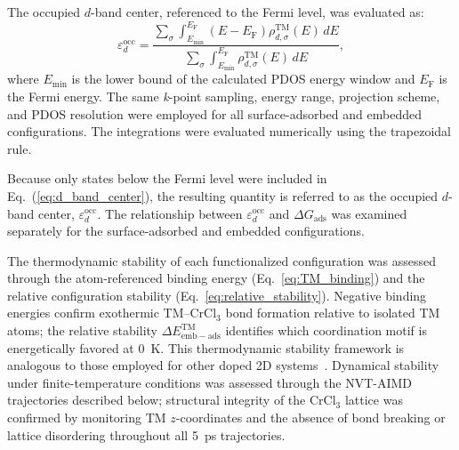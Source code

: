 \documentclass[journal=jacsat,manuscript=article]{achemso}
\begin{document}
The occupied $d$-band center, referenced to the Fermi level,
was evaluated as:
\begin{equation}
  \varepsilon_{d}^{\mathrm{occ}}
  =
  \frac{
    \displaystyle
    \sum_{\sigma}
    \int_{E_{\min}}^{E_{\mathrm{F}}}
    (E-E_{\mathrm{F}})
    \rho_{d,\sigma}^{\mathrm{TM}}(E)\,dE
  }{
    \displaystyle
    \sum_{\sigma}
    \int_{E_{\min}}^{E_{\mathrm{F}}}
    \rho_{d,\sigma}^{\mathrm{TM}}(E)\,dE
  },
  \label{eq:d_band_center}
\end{equation}
where $E_{\min}$ is the lower bound of the calculated PDOS energy window and $E_{\mathrm{F}}$ is the Fermi energy. The same \textit{k}-point sampling, energy range, projection scheme, and PDOS resolution were employed for all surface-adsorbed and embedded configurations. The integrations were evaluated numerically using the trapezoidal rule.

Because only states below the Fermi level were included in Eq.~(\ref{eq:d_band_center}), the resulting quantity is referred to as the occupied $d$-band center, $\varepsilon_{d}^{\mathrm{occ}}$. The relationship between $\varepsilon_{d}^{\mathrm{occ}}$ and $\Delta G_{\mathrm{ads}}$ was examined separately for the surface-adsorbed and embedded configurations.

{\color{revcolor}%
  The thermodynamic stability of each functionalized configuration was assessed through the atom-referenced binding energy (Eq.~\ref{eq:TM_binding}) and the relative configuration stability (Eq.~\ref{eq:relative_stability}). Negative binding energies confirm exothermic TM--CrCl$_3$ bond formation relative to isolated TM atoms; the relative stability $\Delta E_{\mathrm{emb-ads}}^{\mathrm{TM}}$ identifies which coordination motif is energetically favored at 0~K. This thermodynamic stability framework is analogous to those employed for other doped 2D systems~\cite{ApplSurfSci2025_161321,PCCP2018_15863,Vacuum2020_109742,Vacuum2020_109438}. Dynamical stability under finite-temperature conditions was assessed through the NVT-AIMD trajectories described below; structural integrity of the CrCl$_3$ lattice was confirmed by monitoring TM $z$-coordinates and the absence of bond breaking or lattice disordering throughout all 5~ps trajectories.
\par}
\end{document}
